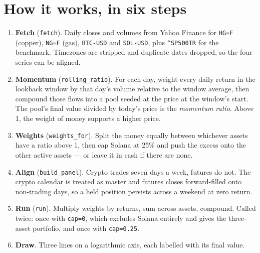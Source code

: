 \documentclass[11pt,a4paper]{article}
\begin{document}
\section{How it works, in six steps}

\begin{enumerate}[leftmargin=2em, itemsep=5pt]
    \item \textbf{Fetch} (\texttt{fetch}). Daily closes and volumes from
          Yahoo Finance for \texttt{HG=F} (copper), \texttt{NG=F} (gas),
          \texttt{BTC-USD} and \texttt{SOL-USD}, plus
          \texttt{\^{}SP500TR} for the benchmark. Timezones are
          stripped and duplicate dates dropped, so the four series can
          be aligned.

    \item \textbf{Momentum} (\texttt{rolling\_ratio}). For each day,
          weight every daily return in the lookback window by that
          day's volume relative to the window average, then compound
          those flows into a pool seeded at the price at the window's
          start. The pool's final value divided by today's price is the
          \emph{momentum ratio}. Above 1, the weight of money supports a
          higher price.

    \item \textbf{Weights} (\texttt{weights\_for}). Split the money
          equally between whichever assets have a ratio above 1, then
          cap Solana at 25\% and push the excess onto the other active
          assets --- or leave it in cash if there are none.

    \item \textbf{Align} (\texttt{build\_panel}). Crypto trades seven
          days a week, futures do not. The crypto calendar is treated as
          master and futures closes forward-filled onto non-trading
          days, so a held position persists across a weekend at zero
          return.

    \item \textbf{Run} (\texttt{run}). Multiply weights by returns, sum
          across assets, compound. Called twice: once with
          \texttt{cap=0}, which excludes Solana entirely and gives the
          three-asset portfolio, and once with \texttt{cap=0.25}.

    \item \textbf{Draw}. Three lines on a logarithmic axis, each
          labelled with its final value.
\end{enumerate}
\end{document}
